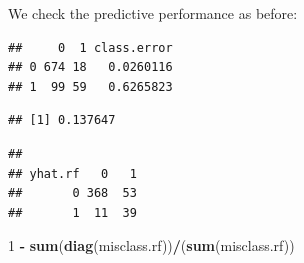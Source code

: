 \documentclass[ignorenonframetext,]{beamer}
\newenvironment{Shaded}{\begin{snugshade}}{\end{snugshade}}
\newcommand{\KeywordTok}[1]{\textcolor[rgb]{0.13,0.29,0.53}{\textbf{#1}}}
\newcommand{\DataTypeTok}[1]{\textcolor[rgb]{0.13,0.29,0.53}{#1}}
\newcommand{\DecValTok}[1]{\textcolor[rgb]{0.00,0.00,0.81}{#1}}
\newcommand{\StringTok}[1]{\textcolor[rgb]{0.31,0.60,0.02}{#1}}
\newcommand{\OperatorTok}[1]{\textcolor[rgb]{0.81,0.36,0.00}{\textbf{#1}}}
\newcommand{\NormalTok}[1]{#1}
\begin{document}
\begin{frame}[fragile]

We check the predictive performance as before: \footnotesize

\begin{Shaded}
\end{Shaded}

\begin{verbatim}
##     0  1 class.error
## 0 674 18   0.0260116
## 1  99 59   0.6265823
\end{verbatim}

\begin{Shaded}
\end{Shaded}

\begin{verbatim}
## [1] 0.137647
\end{verbatim}

\begin{Shaded}
\end{Shaded}

\begin{verbatim}
##        
## yhat.rf   0   1
##       0 368  53
##       1  11  39
\end{verbatim}

\begin{Shaded}
\begin{Highlighting}[]
\DecValTok{1} \OperatorTok{-}\StringTok{ }\KeywordTok{sum}\NormalTok{(}\KeywordTok{diag}\NormalTok{(misclass.rf))}\OperatorTok{/}\NormalTok{(}\KeywordTok{sum}\NormalTok{(misclass.rf))}
\end{Highlighting}
\end{Shaded}


\end{frame}
\end{document}
